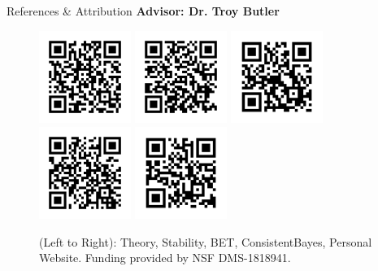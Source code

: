   \begin{block}{References \& Attribution}
    \centering
    \textbf{Advisor: Dr. Troy Butler}
    \begin{figure}
        \includegraphics[width=3cm]{ref-theory}
        \includegraphics[width=3cm]{ref-stability}
        \includegraphics[width=3cm]{ref-bet}
        \includegraphics[width=3cm]{ref-cb}
        \includegraphics[width=3cm]{ref-website}
    \caption*{\centering (Left to Right): Theory, Stability, BET, ConsistentBayes, Personal Website. \newline Funding provided by NSF DMS-1818941.}
    \end{figure}
   

  

  \end{block}

